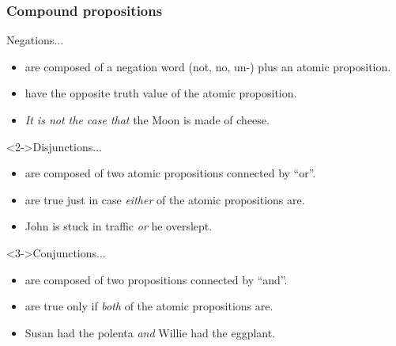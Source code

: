 \documentclass[10pt,letterpaper,xcolor=dvipsnames,handout]{beamer}
\begin{document}
\begin{frame}
\frametitle{Compound propositions}

\begin{block}{Negations...}
\begin{itemize}
  \item are composed of a negation word (not, no, un-) plus an atomic proposition.
  \item have the opposite truth value of the atomic proposition.
  \item \textit{It is not the case that} the Moon is made of cheese.
\end{itemize}
\end{block}

\begin{block}<2->{Disjunctions...}
\begin{itemize}
  \item are composed of two atomic propositions connected by ``or''.
  \item are true just in case \textit{either} of the atomic propositions are.
  \item John is stuck in traffic \textit{or} he overslept.
\end{itemize}
\end{block}

\begin{block}<3->{Conjunctions...}
\begin{itemize}
  \item are composed of two propositions connected by ``and''.
  \item are true only if \textit{both} of the atomic propositions are.
  \item Susan had the polenta \textit{and} Willie had the eggplant.
\end{itemize}
\end{block}

\end{frame}
\end{document}
